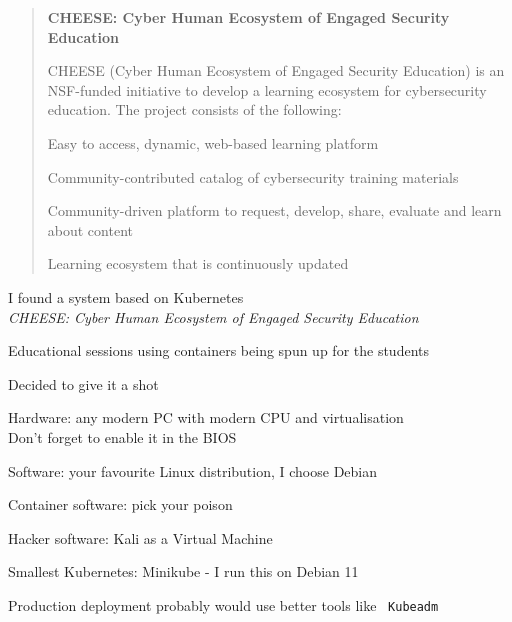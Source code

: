 \documentclass[Screen16to9,17pt]{foils}
\begin{document}


\begin{quote}
{\bf CHEESE: Cyber Human Ecosystem of Engaged Security Education}

CHEESE (Cyber Human Ecosystem of Engaged Security Education) is an NSF-funded initiative to develop a learning ecosystem for cybersecurity education. The project consists of the following:

\begin{list2}
\item Easy to access, dynamic, web-based learning platform
\item Community-contributed catalog of cybersecurity training materials
\item Community-driven platform to request, develop, share, evaluate and learn about content
\item Learning ecosystem that is continuously updated
\end{list2}
\end{quote}

\begin{list2}
\item I found a system based on Kubernetes \\
\emph{CHEESE: Cyber Human Ecosystem of Engaged Security Education}\\
\item Educational sessions using containers being spun up for the students
\item Decided to give it a shot
\end{list2}




\begin{list2}
\item Hardware: any modern PC with modern CPU and virtualisation\\
Don't forget to enable it in the BIOS
\item Software: your favourite Linux distribution, I choose Debian
\item Container software: pick your poison
\item Hacker software: Kali as a Virtual Machine 
\item Smallest Kubernetes: Minikube -  I run this on Debian 11
\item Production deployment probably would use better tools like \faWrench\ \verb+Kubeadm+
\end{list2}
\end{document}
